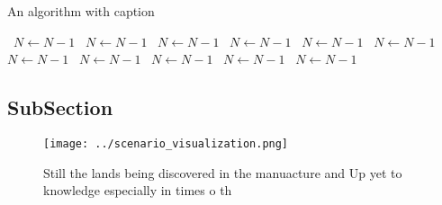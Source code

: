\documentclass[a4paper]{article}
\begin{document}
\begin{algorithm}
\caption{An algorithm with caption}
\begin{algorithmic}
\    \State $N \gets N - 1$
\    \State $N \gets N - 1$
\    \State $N \gets N - 1$
\    \State $N \gets N - 1$
\    \State $N \gets N - 1$
\    \State $N \gets N - 1$
\    \State $N \gets N - 1$
\    \State $N \gets N - 1$
\    \State $N \gets N - 1$
\    \State $N \gets N - 1$
\    \State $N \gets N - 1$
\EndWhile
\end{algorithmic}
\end{algorithm}

\subsection{SubSection}

\begin{figure}
\centering
\texttt{[image: ../scenario\_visualization.png]}
\caption{Still the lands being discovered in the manuacture and Up yet to knowledge especially in times o th
}
\end{figure}
 
\end{document}
